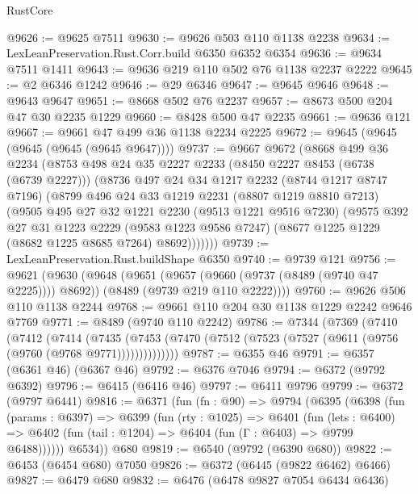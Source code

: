 \begin{lexlean}{RustCore}
\begin{coremodule}
@9626 := @9625 @7511
@9630 := @9626 @503 @110 @1138 @2238
@9634 := LexLeanPreservation.Rust.Corr.build @6350 @6352 @6354
@9636 := @9634 @7511 @1411
@9643 := @9636 @219 @110 @502 @76 @1138 @2237 @2222
@9645 := @2 @6346 @1242
@9646 := @29 @6346
@9647 := @9645 @9646
@9648 := @9643 @9647
@9651 := @8668 @502 @76 @2237
@9657 := @8673 @500 @204 @47 @30 @2235 @1229
@9660 := @8428 @500 @47 @2235
@9661 := @9636 @121
@9667 := @9661 @47 @499 @36 @1138 @2234 @2225
@9672 := @9645 (@9645 (@9645 (@9645 (@9645 @9647))))
@9737 := @9667
    @9672
    (@8668
      @499
      @36
      @2234
      (@8753
        @498
        @24
        @35
        @2227
        @2233
        (@8450 @2227 @8453 (@6738 (@6739 @2227)))
        (@8736
          @497
          @24
          @34
          @1217
          @2232
          (@8744 @1217 @8747 @7196)
          (@8799
            @496
            @24
            @33
            @1219
            @2231
            (@8807 @1219 @8810 @7213)
            (@9505
              @495
              @27
              @32
              @1221
              @2230
              (@9513 @1221 @9516 @7230)
              (@9575
                @392
                @27
                @31
                @1223
                @2229
                (@9583 @1223 @9586 @7247)
                (@8677 @1225 @1229 (@8682 @1225 @8685 @7264) @8692)))))))
@9739 := LexLeanPreservation.Rust.buildShape @6350
@9740 := @9739 @121
@9756 := @9621
    (@9630
      (@9648
        (@9651 (@9657 (@9660 (@9737 (@8489 (@9740 @47 @2225)))) @8692))
        (@8489 (@9739 @219 @110 @2222))))
@9760 := @9626 @506 @110 @1138 @2244
@9768 := @9661 @110 @204 @30 @1138 @1229 @2242 @9646 @7769
@9771 := @8489 (@9740 @110 @2242)
@9786 := @7344
    (@7369
      (@7410
        (@7412
          (@7414
            (@7435
              (@7453 (@7470 (@7512 (@7523 (@7527 (@9611 (@9756 (@9760 (@9768 @9771))))))))))))))
@9787 := @6355 @46
@9791 := @6357 (@6361 @46) (@6367 @46)
@9792 := @6376 @7046
@9794 := @6372 (@9792 @6392)
@9796 := @6415 (@6416 @46)
@9797 := @6411 @9796
@9799 := @6372 (@9797 @6441)
@9816 := @6371
    (fun (fn : @90) =>
    @9794
      (@6395
        (@6398
          (fun (params : @6397) =>
          @6399
            (fun (rty : @1025) =>
            @6401
              (fun (lets : @6400) =>
              @6402 (fun (tail : @1204) => @6404 (fun (Γ : @6403) => @9799 @6488))))))
        @6534))
    @680
@9819 := @6540 (@9792 (@6390 @680))
@9822 := @6453 (@6454 @680) @7050
@9826 := @6372 (@6445 (@9822 @6462) @6466)
@9827 := @6479 @680
@9832 := @6476 (@6478 @9827 @7054 @6434 @6436)

\end{coremodule}
\end{lexlean}
